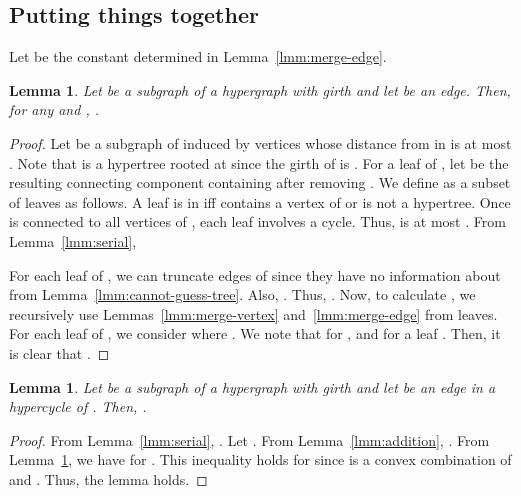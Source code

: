 \documentclass[letterpaper,11pt]{article}
\newtheorem{lemma}[theorem]{Lemma}
\begin{document}
\subsection{Putting things together}
Let  be the constant determined in Lemma~\ref{lmm:merge-edge}.
\begin{lemma}\label{lmm:E+S-to-v}
  Let  be a subgraph of a hypergraph  with girth  and let  be an edge.
  Then, for any  and , .
\end{lemma}
\begin{proof}
  Let  be a subgraph of  induced by vertices whose distance from  in  is at most .
  Note that  is a hypertree rooted at  since the girth of  is .
  For a leaf  of , let  be the resulting connecting component containing  after removing .
  We define  as a subset of leaves as follows.
  A leaf  is in  iff  contains a vertex of  or  is not a hypertree.
  Once  is connected to all vertices of , 
  each leaf  involves a cycle.
  Thus,  is at most .
  From Lemma~\ref{lmm:serial}, 
  
  For each leaf  of , 
  we can truncate edges of  since they have no information about  from Lemma~\ref{lmm:cannot-guess-tree}.
  Also, .
  Thus, .
  Now, to calculate , 
  we recursively use Lemmas~\ref{lmm:merge-vertex} and~\ref{lmm:merge-edge} from leaves.
  For each leaf  of , 
  we consider  where .
  We note that  for ,
  and  for a leaf .
  Then, it is clear that .
\end{proof}

\begin{lemma}\label{lmm:E-to-e}
  Let  be a subgraph of a hypergraph  with girth  and let  be an edge in a hypercycle of .
  Then, .
\end{lemma}
\begin{proof}
  From Lemma~\ref{lmm:serial},
  .
  Let .
  From Lemma~\ref{lmm:addition}, 
  .
  From Lemma~\ref{lmm:E+S-to-v}, 
  we have  for .
  This inequality holds for  since  is a convex combination of  and .
  Thus, the lemma holds.
\end{proof}
\end{document}
